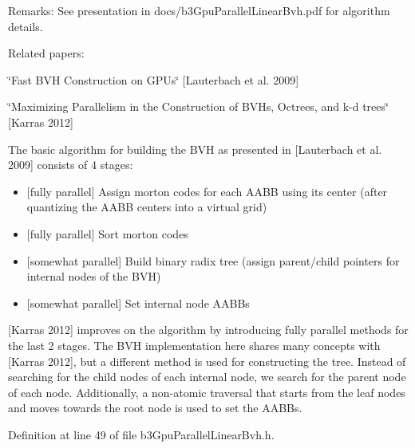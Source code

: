 \begin{Desc}
\item[Remarks:]See presentation in docs/b3GpuParallelLinearBvh.pdf for algorithm details. \end{Desc}
\begin{Desc}
\item[]Related papers: \par
 \char`\"{}Fast BVH Construction on GPUs\char`\"{} \mbox{[}Lauterbach et al. 2009\mbox{]} \par
 \char`\"{}Maximizing Parallelism in the Construction of BVHs, Octrees, and k-d trees\char`\"{} \mbox{[}Karras 2012\mbox{]} \par
 \end{Desc}
\begin{Desc}
\item[]The basic algorithm for building the BVH as presented in \mbox{[}Lauterbach et al. 2009\mbox{]} consists of 4 stages:\begin{itemize}
\item \mbox{[}fully parallel\mbox{]} Assign morton codes for each AABB using its center (after quantizing the AABB centers into a virtual grid)\item \mbox{[}fully parallel\mbox{]} Sort morton codes\item \mbox{[}somewhat parallel\mbox{]} Build binary radix tree (assign parent/child pointers for internal nodes of the BVH)\item \mbox{[}somewhat parallel\mbox{]} Set internal node AABBs \end{itemize}
\end{Desc}
\begin{Desc}
\item[]\mbox{[}Karras 2012\mbox{]} improves on the algorithm by introducing fully parallel methods for the last 2 stages. The BVH implementation here shares many concepts with \mbox{[}Karras 2012\mbox{]}, but a different method is used for constructing the tree. Instead of searching for the child nodes of each internal node, we search for the parent node of each node. Additionally, a non-atomic traversal that starts from the leaf nodes and moves towards the root node is used to set the AABBs. \end{Desc}


Definition at line 49 of file b3GpuParallelLinearBvh.h.

